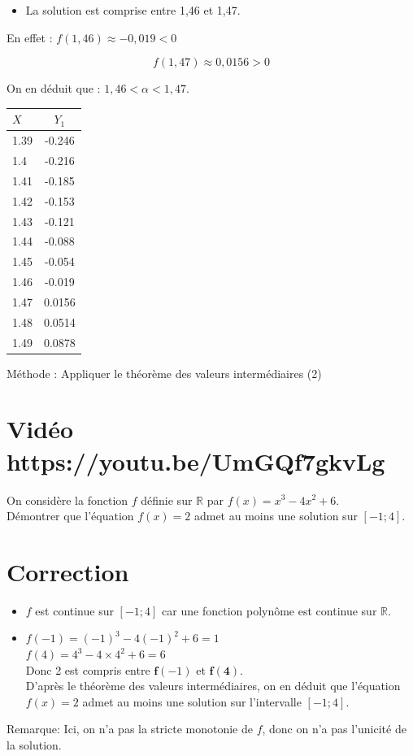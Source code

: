 \documentclass[10pt]{article}
\begin{document}
\begin{itemize}
  \item La solution est comprise entre 1,46 et 1,47.
\end{itemize}

En effet : \(f(1,46) \approx-0,019<0\)

\[
f(1,47) \approx 0,0156>0
\]

On en déduit que : \(1,46<\alpha<1,47\).

\begin{center}
\begin{tabular}{l|c|}
\hline
\(X\) & \(Y_{1}\) \\
\hline
1.39 & -0.246 \\
\hline
1.4 & -0.216 \\
\hline
1.41 & -0.185 \\
\hline
1.42 & -0.153 \\
\hline
1.43 & -0.121 \\
\hline
1.44 & -0.088 \\
\hline
1.45 & -0.054 \\
\hline
1.46 & -0.019 \\
\hline
1.47 & 0.0156 \\
\hline
1.48 & 0.0514 \\
\hline
1.49 & 0.0878 \\
\hline
\end{tabular}
\end{center}

Méthode : Appliquer le théorème des valeurs intermédiaires (2)

\section*{Vidéo https://youtu.be/UmGQf7gkvLg}
On considère la fonction \(f\) définie sur \(\mathbb{R}\) par \(f(x)=x^{3}-4 x^{2}+6\).\\
Démontrer que l'équation \(f(x)=2\) admet au moins une solution sur \([-1 ; 4]\).

\section*{Correction}
\begin{itemize}
  \item \(f\) est continue sur \([-1 ; 4]\) car une fonction polynôme est continue sur \(\mathbb{R}\).
  \item \(f(-1)=(-1)^{3}-4(-1)^{2}+6=1\)\\
\(f(4)=4^{3}-4 \times 4^{2}+6=6\)\\
Donc 2 est compris entre \(\boldsymbol{f}(-1)\) et \(\boldsymbol{f}(\mathbf{4})\).\\
D'après le théorème des valeurs intermédiaires, on en déduit que l'équation \(f(x)=2\) admet au moins une solution sur l'intervalle \([-1 ; 4]\).
\end{itemize}

Remarque: Ici, on n'a pas la stricte monotonie de \(f\), donc on n'a pas l'unicité de la solution.
\end{document}

